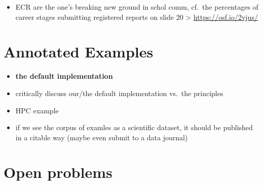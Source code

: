 \documentclass[12pt]{article}
\begin{document}
\begin{itemize}
  \begin{itemize}
  \item
    ECR are the one's breaking new ground in schol comm, cf.~the
    percentages of career stages submitting registered reports on slide
    20 \textgreater{} \url{https://osf.io/2vjus/}
  \end{itemize}
\end{itemize}

\section*{Annotated Examples}\label{annotated-examples}

\begin{itemize}
\item
  \textbf{the default implementation}
\item
  critically discuss our/the default implementation vs.~the principles
\item
  HPC example
\item
  if we see the corpus of examles as a scientific dataset, it should be
  published in a citable way (maybe even submit to a data journal)
\end{itemize}

\section*{Open problems}\label{open-problems}
\end{document}
